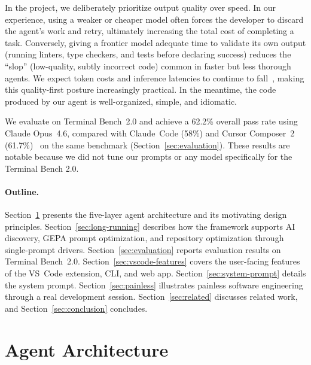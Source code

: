 \documentclass{article}
\begin{document}
In the project, we deliberately prioritize output quality over speed.  In our experience, using a weaker or cheaper model often forces the developer to discard the agent's work and retry, ultimately increasing the total cost of completing a task.  Conversely, giving a frontier model adequate time to validate its own output (running linters, type checkers, and tests before declaring success) reduces the ``slop'' (low-quality, subtly incorrect code) common in faster but less thorough agents.  We expect token costs and inference latencies to continue to fall~\citep {gao2025trae}, making this quality-first posture increasingly practical.  In the meantime, the code produced by our agent is well-organized, simple, and idiomatic.

We evaluate on Terminal Bench~2.0 and achieve a 62.2\% overall pass rate using Claude Opus~4.6, compared with Claude~Code (58\%) and Cursor Composer~2 (61.7\%)~\citep{cursor2026composer2} on the same benchmark (Section~\ref{sec:evaluation}).  These results are notable because we did not tune our prompts or any model specifically for the Terminal Bench 2.0.

\paragraph{Outline.}
Section~\ref{sec:architecture} presents the five-layer agent architecture and its motivating design principles. Section~\ref{sec:long-running} describes how the framework supports AI discovery, GEPA prompt optimization, and repository optimization through single-prompt drivers. Section~\ref{sec:evaluation} reports evaluation results on Terminal Bench~2.0.  Section~\ref{sec:vscode-features} covers the user-facing features of the VS~Code extension, CLI, and web app. Section~\ref{sec:system-prompt} details the system prompt. Section~\ref{sec:painless} illustrates painless software engineering through a real development session. Section~\ref{sec:related} discusses related work, and Section~\ref{sec:conclusion} concludes.

\section{Agent Architecture}
\label{sec:architecture}
\end{document}
